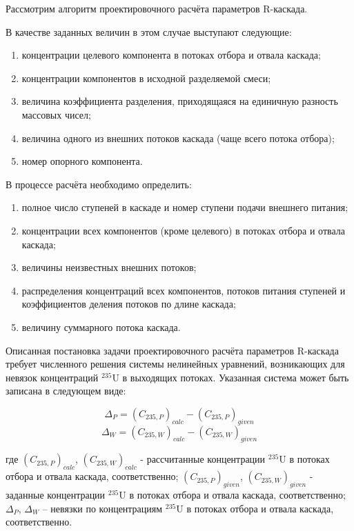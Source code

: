 Рассмотрим алгоритм проектировочного расчёта параметров R-каскада. 

В качестве заданных величин в этом случае выступают следующие:

\begin{enumerate}
  \item концентрации целевого компонента в потоках отбора и отвала каскада;
  \item концентрации компонентов в исходной разделяемой смеси;
  \item величина коэффициента разделения, приходящаяся на единичную разность массовых чисел;
  \item величина одного из внешних потоков каскада (чаще всего потока отбора);
  \item номер опорного компонента.
\end{enumerate}


В процессе расчёта необходимо определить:


\begin{enumerate}
  \item полное число ступеней в каскаде и номер ступени подачи внешнего питания;
  \item концентрации всех компонентов (кроме целевого) в потоках отбора и отвала каскада;
  \item величины неизвестных внешних потоков;
  \item распределения концентраций всех компонентов, потоков питания ступеней и коэффициентов деления потоков по длине каскада;
  \item величину суммарного потока каскада.
\end{enumerate}

Описанная постановка задачи проектировочного расчёта параметров R-каскада требует численного решения системы нелинейных уравнений, возникающих для невязок концентраций $^{235}$U в выходящих потоках. Указанная система может быть записана в следующем виде: 


\begin{equation}
  \label{dis_235P}
  \Delta_{P} = {(C_{235, P})}_{calc}-{(C_{235, P})}_{given}
\end{equation}
\begin{equation}
  \label{dis_235W}
  \Delta_{W} = {(C_{235, W})}_{calc}-{(C_{235, W})}_{given}
\end{equation}

где ${(C_{235, P})}_{calc}$, ${(C_{235, W})}_{calc}$ - рассчитанные концентрации $^{235}$U в потоках отбора и отвала каскада, соответственно; ${(C_{235, P})}_{given}$, ${(C_{235, W})}_{given}$ - заданные концентрации $^{235}$U в потоках отбора и отвала каскада, соответственно; $\Delta_{P}$, $\Delta_{W}$ -- невязки по концентрациям $^{235}$U в потоках отбора и отвала каскада, соответственно. 

